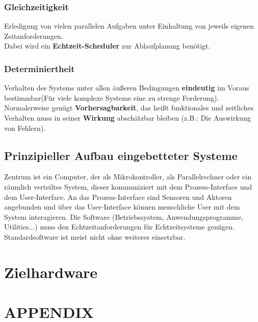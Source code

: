 \documentclass[a4paper, 10 pt, conference]{ieeeconf}
\begin{document}
\subsubsection*{Gleichzeitigkeit}
Erledigung von vielen parallelen Aufgaben unter Einhaltung von jeweils eigenen Zeitanforderungen. \\
Dabei wird ein \textbf{Echtzeit-Scheduler} zur Ablaufplanung benötigt. 
\subsubsection*{Determiniertheit}
Verhalten des Systems unter allen äußeren Bedingungen  \textbf{eindeutig} im Voraus bestimmbar(Für viele komplexe Systeme  eine zu strenge Forderung). Normalerweise genügt \textbf{Vorhersagbarkeit}, das heißt funktionales und zeitliches Verhalten muss in seiner \textbf{Wirkung} abschätzbar bleiben (z.B.: Die Auswirkung von Fehlern). 


\subsection*{Prinzipieller Aufbau eingebetteter Systeme}
Zentrum ist ein Computer, der als Mikrokontroller, als Parallelrechner oder ein räumlich verteiltes System, dieser kommuniziert mit dem Prozess-Interface und dem User-Interface. An das Prozess-Interface sind Sensoren und Aktoren angebunden und über das User-Interface können menschliche User mit dem System interagieren. Die Software (Betriebssystem, Anwendungsprogramme, Utilities...) muss den Echtzeitanforderungen für Echtzeitsysteme genügen. 
Standardsoftware ist meist nicht ohne weiteres einsetzbar. 

\pagebreak

\section{Zielhardware}






\section*{APPENDIX}



\printbibliography
\end{document}
